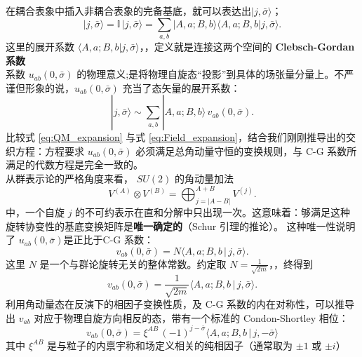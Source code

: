 在耦合表象中插入非耦合表象的完备基底，就可以表达出$|j, \bar{\sigma}\rangle$；
\begin{equation}
    |j, \bar{\sigma}\rangle = \mathbb{I} \, |j, \bar{\sigma}\rangle = \sum_{a,b} |A,a; B,b\rangle \langle A,a; B,b | j, \bar{\sigma}\rangle.
    \label{eq:QM_expansion}
\end{equation}
这里的展开系数 $\langle A,a; B,b | j, \bar{\sigma}\rangle$，，定义就是连接这两个空间的 \textbf{Clebsch-Gordan 系数}
\vspace{2ex}\\
系数 $u_{ab}(0, \bar{\sigma})$ 的物理意义;是将物理自旋态“投影”到具体的场张量分量上。不严谨但形象的说，$u_{ab}(0, \bar{\sigma})$ 充当了态矢量的展开系数：
\begin{equation}
    |j, \bar{\sigma}\rangle \sim \sum_{a,b} |A,a; B,b\rangle \, v_{ab}(0, \bar{\sigma}).
    \label{eq:Field_expansion}
\end{equation}
比较式 \eqref{eq:QM_expansion} 与式 \eqref{eq:Field_expansion}，结合我们刚刚推导出的交织方程：方程要求 $u_{ab}(0, \bar{\sigma})$ 必须满足总角动量守恒的变换规则，与 C-G 系数所满足的代数方程是完全一致的。
\vspace{2ex}\\
从群表示论的严格角度来看， $SU(2)$ 的角动量加法 
\begin{equation}
V^{(A)} \otimes V^{(B)}
=
\bigoplus_{j=|A-B|}^{A+B}
V^{(j)} .
\label{eq:CG_decomposition}
\end{equation} 中，一个自旋 $j$ 的不可约表示在直和分解中只出现一次。这意味着：够满足这种旋转协变性的基底变换矩阵是\textbf{唯一确定的}（Schur 引理的推论）。
这种唯一性说明了 $u_{ab}(0, \bar{\sigma})$是正比于C-G 系数：
\begin{equation}
    v_{ab}(0, \bar{\sigma}) = N \langle A,a; B,b \,|\, j, \bar{\sigma}\rangle.
    \label{eq:uCG_proportional}
\end{equation}
这里 $N$ 是一个与群论旋转无关的整体常数。约定取 $N = \frac{1}{\sqrt{2m}}$，，终得到
\begin{equation}
    v_{ab}(0, \bar{\sigma}) = \frac{1}{\sqrt{2m}} \langle A,a; B,b \,|\, j, \bar{\sigma}\rangle.
\end{equation}
利用角动量态在反演下的相因子变换性质，及 C-G 系数的内在对称性，可以推导出 $v_{ab}$ 对应于物理自旋方向相反的态，带有一个标准的 Condon-Shortley 相位：
\begin{equation}
    v_{ab}(0,\bar{\sigma}) = \xi^{AB} \, (-1)^{j-\bar{\sigma}} \langle A, a ; B, b \,|\, j, -\bar{\sigma} \rangle
    \label{eq:v_CG}
\end{equation}
其中 $\xi^{AB}$ 是与粒子的内禀宇称和场定义相关的纯相因子（通常取为 $\pm 1$ 或 $\pm i$）
